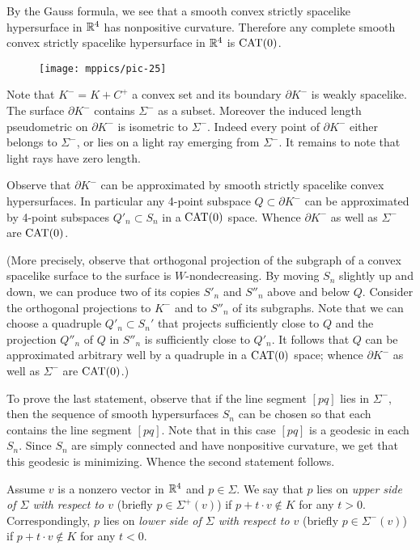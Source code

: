 \documentclass{article}
\begin{document}
By the Gauss formula, we see that a smooth convex strictly spacelike hypersurface in $\mathbb{R}^4$ has nonpositive curvature.
Therefore any complete smooth convex strictly spacelike hypersurface in $\mathbb{R}^4$ is $\mathrm{CAT}(0)$.

\begin{wrapfigure}{r}{55mm}
\vskip-0mm
\centering
\texttt{[image: mppics/pic-25]}
\end{wrapfigure}

Note that $K^-=K+C^+$ a convex set and its boundary $\partial K^-$ is weakly spacelike.
The surface $\partial K^-$ contains $\Sigma^-$ as a subset.
Moreover the induced length pseudometric on $\partial K^-$ is isometric to $\Sigma^-$.
Indeed every point of $\partial K^-$ either belongs to  $\Sigma^-$, or lies on a light ray emerging from $\Sigma^-$.
It remains to note that light rays have zero length.

Observe that $\partial K^-$ can be approximated by smooth strictly spacelike convex hypersurfaces.
In particular any 4-point subspace $Q\subset\partial K^-$ can be approximated by 4-point subspaces $Q'_n\subset S_n$ in a $\mathrm{CAT}(0)$ space.
Whence $\partial K^-$ as well as $\Sigma^-$ are $\mathrm{CAT}(0)$.

(More precisely, observe that orthogonal projection of the subgraph of a convex spacelike surface to the surface is $W$-nondecreasing.
By moving $S_n$ slightly up and down,
we can produce two of its copies $S'_n$ and $S''_n$ above and below $Q$.
Consider the orthogonal projections to $K^-$ and to $S''_n$ of its subgraphs.
Note that we can choose a quadruple $Q'_n\subset S_n'$ that projects sufficiently close to $Q$ and the projection $Q''_n$ of $Q$ in $S''_n$ is sufficiently close to $Q'_n$.
It follows that $Q$ can be approximated arbitrary well by a quadruple in a $\mathrm{CAT}(0)$ space; whence $\partial K^-$ as well as $\Sigma^-$ are $\mathrm{CAT}(0)$.)

To prove the last statement, observe that if the line segment $[pq]$ lies in $\Sigma^-$,
then the sequence of smooth hypersurfaces $S_n$ can be chosen so that each contains the line segment $[pq]$.
Note that in this case $[pq]$ is a geodesic in each $S_n$.
Since $S_n$ are simply connected and have nonpositive curvature, we get that this geodesic is minimizing.
Whence the second statement follows.
\qeds

Assume $v$ is a nonzero vector in $\mathbb{R}^4$ and $p\in\Sigma$.
We say that $p$ lies on \emph{upper side of $\Sigma$ with respect to $v$} (briefly $p\in \Sigma^+(v)$) if $p+t\cdot v\notin K$ for any $t>0$.
Correspondingly, $p$ lies on \emph{lower side of $\Sigma$ with respect to $v$} (briefly $p\in \Sigma^-(v)$) if $p+t\cdot v\notin K$ for any $t<0$.
\end{document}
